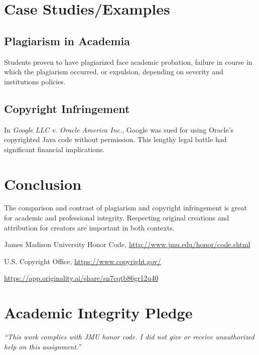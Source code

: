 \documentclass[12pt]{article}
\begin{document}
\section{Case Studies/Examples}
\subsection{Plagiarism in Academia}
Students proven to have plagiarized face academic probation, failure in course in which the plagiarism occurred, or expulsion, depending on severity and institutions policies.
\subsection{Copyright Infringement}
In \textit{Google LLC v. Oracle America Inc.}, Google was sued for using Oracle's copyrighted Java code without permission. This lengthy legal battle had significant financial implications.

\section{Conclusion}
The comparison and contrast of plagiarism and copyright infringement is great for academic and professional integrity. Respecting original creations and attribution for creators are important in both contexts.
 
\begin{thebibliography}{9}
James Madison University Honor Code, \url{http://www.jmu.edu/honor/code.shtml}
 
U.S. Copyright Office, \url{https://www.copyright.gov/}
 
\url{https://app.originality.ai/share/sn7cqtb86gr12u40}
 
\end{thebibliography}
 
\vfill
\section*{Academic Integrity Pledge}
{\color{red}\textit{“This work complies with JMU honor code. I did not give or receive unauthorized help on this assignment.”}}
 
\end{document}
